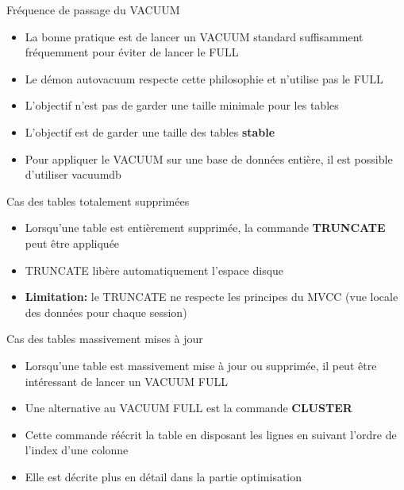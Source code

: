 \begin{frame}{Fréquence de passage du VACUUM}

   \begin{itemize}
      \item La bonne pratique est de lancer un VACUUM standard suffisamment fréquemment pour éviter de lancer le FULL
      \item Le démon autovacuum respecte cette philosophie et n'utilise pas le FULL
      \item L'objectif n'est pas de garder une taille minimale pour les tables
      \item L'objectif est de garder une taille des tables \textbf{stable}
      \item Pour appliquer le VACUUM sur une base de données entière, il est possible d'utiliser \textsf{vacuumdb}
   \end{itemize}

\end{frame}


\begin{frame}{Cas des tables totalement supprimées}

   \begin{itemize}
      \item Lorsqu'une table est entièrement supprimée, la commande \textbf{TRUNCATE} peut être appliquée
      \item TRUNCATE libère automatiquement l'espace disque
      \item \textbf{Limitation:} le TRUNCATE ne respecte les principes du MVCC (vue locale des données pour chaque session)
   \end{itemize}

\end{frame}


\begin{frame}{Cas des tables massivement mises à jour}

   \begin{itemize}
      \item Lorsqu'une table est massivement mise à jour ou supprimée, il peut être intéressant de lancer un VACUUM FULL
      \item Une alternative au VACUUM FULL est la commande \textbf{CLUSTER}
      \item Cette commande réécrit la table en disposant les lignes en suivant l'ordre de l'index d'une colonne
      \item Elle est décrite plus en détail dans la partie optimisation
   \end{itemize}

\end{frame}

